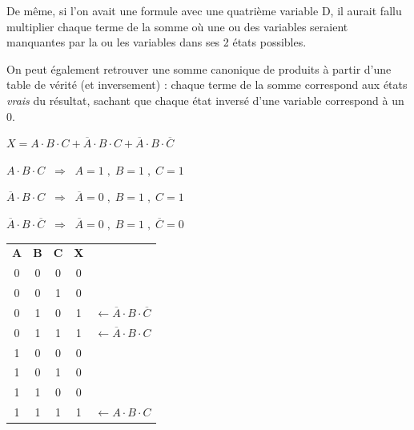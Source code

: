 \documentclass[11pt,a4paper]{article}
\begin{document}
\smallskip

De même, si l'on avait une formule avec une quatrième variable D, il aurait fallu multiplier chaque terme de la somme où une ou des variables seraient manquantes par la ou les variables dans ses 2 états possibles.

\bigskip

On peut également retrouver une somme canonique de produits à partir d'une table de vérité (et inversement) : chaque terme de la somme correspond aux états \textit{vrais} du résultat, sachant que chaque état inversé d'une variable correspond à un $ 0 $.

\begin{center}
$ X = A \cdot B \cdot C + \overline{A} \cdot B \cdot C + \overline{A} \cdot B \cdot \overline{C} $

\smallskip

$ A \cdot B \cdot C  \; \; \Rightarrow \; \;  A = 1 \; , \; B = 1 \; , \; C = 1 $

$ \overline{A} \cdot B \cdot C  \; \; \Rightarrow \; \;  \overline{A} = 0 \; , \; B = 1 \; , \; C = 1 $

$ \overline{A} \cdot B \cdot \overline{C}  \; \; \Rightarrow \; \;  \overline{A} = 0 \; , \; B = 1 \; , \; \overline{C} = 0 $

\medskip

\begin{tabular}{| c | c | c || c | l }
\cline{0-3}
\cellcolor{black!15} \textbf{A} & \cellcolor{black!15} \textbf{B} & \cellcolor{black!15} \textbf{C}  &  \cellcolor{black!15} \textbf{X}  & \\
\cline{0-3}
0 & 0 & 0  &  \cellcolor{black!15} 0  & \\ \cline{0-3}
0 & 0 & 1  &  \cellcolor{black!15} 0  & \\ \cline{0-3}
0 & 1 & 0  &  \cellcolor{black!15} 1  & $ \leftarrow \overline{A} \cdot B \cdot \overline{C} $ \\ \cline{0-3}
0 & 1 & 1  &  \cellcolor{black!15} 1  & $ \leftarrow \overline{A} \cdot B \cdot C $ \\ \cline{0-3}
1 & 0 & 0  &  \cellcolor{black!15} 0  & \\ \cline{0-3}
1 & 0 & 1  &  \cellcolor{black!15} 0  & \\ \cline{0-3}
1 & 1 & 0  &  \cellcolor{black!15} 0  & \\ \cline{0-3}
1 & 1 & 1  &  \cellcolor{black!15} 1  & $ \leftarrow  A \cdot B \cdot C $ \\ \cline{0-3}
\end{tabular}
\end{center}
\end{document}
